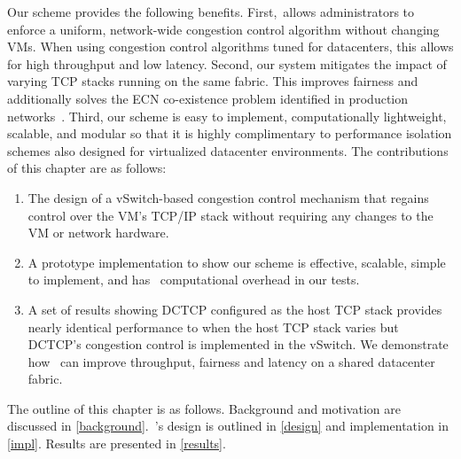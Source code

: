 Our scheme provides the following benefits. First,~\acdc allows
administrators to enforce a uniform, network-wide congestion control algorithm without changing VMs. When using congestion control algorithms tuned for 
datacenters, this allows for high throughput and low latency. Second,
our system mitigates the impact of varying TCP stacks running on the same fabric. This improves fairness and additionally
solves the ECN co-existence problem identified in production networks~\cite{wu2012tuning,judd2015nsdi}. 
Third, our scheme is easy to implement, computationally lightweight, scalable, and modular so that it is highly complimentary to
performance isolation schemes also designed for virtualized datacenter environments.
The contributions of this chapter are as follows:
\begin{enumerate}
\item The design of a vSwitch-based congestion control mechanism that regains control over the VM's TCP/IP stack
without requiring any changes to the VM or network hardware. 
\item A prototype implementation to show our scheme is effective, scalable, simple to implement, and has~ computational overhead in our tests.
\item A set of results showing DCTCP configured as the host TCP stack provides nearly identical
performance to when the host TCP stack varies but DCTCP's congestion control is implemented in the vSwitch. We demonstrate how~\acdc{} can improve
throughput, fairness and latency on a shared datacenter fabric.
\end{enumerate}

The outline of this chapter is as follows. Background and motivation are discussed in \cref{background}.~\acdc{}'s design is outlined in \cref{design} and
implementation in \cref{impl}. Results are presented in \cref{results}.

